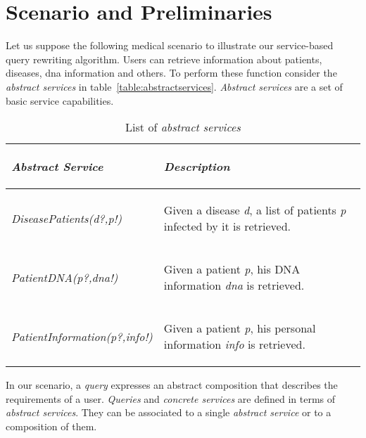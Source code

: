 \section{Scenario and Preliminaries}
Let us suppose the following medical scenario to illustrate our service-based query rewriting algorithm. Users can retrieve information about patients, diseases, dna information and others.
To perform these function consider the \textit{abstract services} in table~\ref{table:abstractservices}. 
\textit{Abstract services} are a set of basic service capabilities. 

\begin{table}[h!]
\center
\begin{tabular}{|p{3.7cm}|p{4cm}|}
\hline
\begin{small} \textbf{\textit{Abstract Service}} \end{small} & \begin{small}\textbf{\textit{Description}} \end{small}\\ 
\hline 
\begin{small} \textit{DiseasePatients(d?,p!)} \end{small} & \begin{small} Given a disease \textit{d}, a list of patients \textit{p} infected by it is retrieved. \end{small}\\ 
\hline 
\begin{small} \textit{PatientDNA(p?,dna!)} \end{small} & \begin{small} Given a patient \textit{p}, his DNA information \textit{dna} is retrieved. \end{small}\\ 
\hline 
\begin{small} \textit{PatientInformation(p?,info!)} \end{small} & \begin{small} Given a patient \textit{p}, his personal information \textit{info} is retrieved. \end{small}\\ 
\hline 
\end{tabular} \caption{List of \textit{abstract services}}
\end{table}\label{table:abstractservices}

In our scenario, a \textit{query} expresses an abstract composition that describes the requirements of a user.
\textit{Queries} and \textit{concrete services} are defined in terms of \textit{abstract services}.
They can be associated to a single \textit{abstract service} or to a composition of them.

